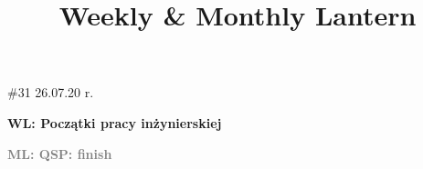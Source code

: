 \documentclass[a4paper]{article}
\title{Weekly \& Monthly Lantern}   %
\newcommand{\weekNumber}{31}
\newcommand{\SundayDate}{26.07.20 r.}
\newcommand{\WL}{Początki pracy inżynierskiej}
\newcommand{\ML}{QSP: finish}
\begin{document}
\begin{landscape}
\thispagestyle{empty}   %
\#\weekNumber
\hfill
\SundayDate
\bigskip \bigskip \bigskip \bigskip \bigskip \bigskip
\begin{center}
\fontsize{50}{0}\selectfont \textbf{WL: \WL}
\newline
\fontsize{40}{0}\selectfont

\vspace{7cm} %
\fontsize{50}{0}\selectfont \textbf{\textcolor{gray}{ML: \ML}}
\end{center}
\end{landscape}
\end{document}
